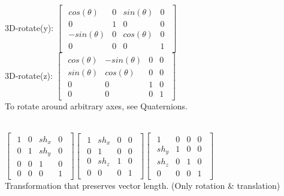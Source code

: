 3D-rotate(y):
$\begin{bmatrix}
    \begin{smallmatrix}
        cos(\theta) & 0 & sin(\theta) & 0 \\
        0 & 1 & 0 & 0 \\
        -sin(\theta) & 0 & cos(\theta) & 0\\
        0 & 0 & 0 & 1
    \end{smallmatrix}
\end{bmatrix}$\\
3D-rotate(z):
$\begin{bmatrix}
    \begin{smallmatrix}
        cos(\theta) & -sin(\theta) & 0 & 0 \\
        sin(\theta) & cos(\theta) & 0 & 0 \\
        0 & 0 & 1 & 0\\
        0 & 0 & 0 & 1
    \end{smallmatrix}
\end{bmatrix}$\\
To rotate around arbitrary axes, see Quaternions. 

\\
$
\begin{bmatrix}
    \begin{smallmatrix}
    1 & 0 & sh_x & 0 \\
    0 & 1 & sh_y & 0 \\
    0 & 0 & 1 & 0 \\
    0 & 0 & 0 & 1
    \end{smallmatrix}
\end{bmatrix}
$$
\begin{bmatrix}
    \begin{smallmatrix}
    1 & sh_x & 0 & 0 \\
    0 & 1 & 0 & 0 \\
    0 & sh_z & 1 & 0 \\
    0 & 0 & 0 & 1
    \end{smallmatrix}
\end{bmatrix}
$$
\begin{bmatrix}
    \begin{smallmatrix}
    1 & 0 & 0 & 0 \\
    sh_y & 1 & 0 & 0 \\
    sh_z & 0 & 1 & 0 \\
    0 & 0 & 0 & 1
    \end{smallmatrix}
\end{bmatrix}
$\\
Transformation that preserves vector length. (Only rotation \& translation)


